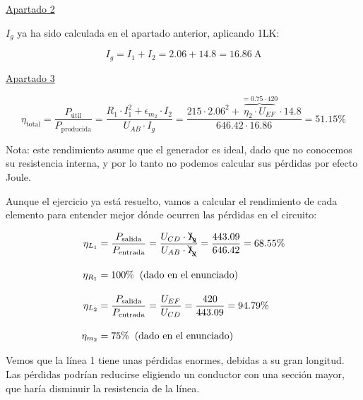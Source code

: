 \documentclass[10pt]{article}
\begin{document}
\vspace{4mm}

\underline{Apartado 2}

\vspace{4mm}

$I_g$ ya ha sido calculada en el apartado anterior, aplicando 1LK:

\[
    I_g = I_1 + I_2 = 2.06 + 14.8 = \boxed{ \qty{16.86}{\ampere} }
\]

\vspace{4mm}

\underline{Apartado 3}

\vspace{-1mm}

\[
    \eta_{\textrm{total}} = \frac{P_{\textrm{útil}}}{P_{\textrm{producida}}} = \frac{R_1\cdot I_1^2 + \epsilon_{m_2} \cdot I_2}{U_{AB} \cdot I_g} = \frac{215 \cdot 2.06^2 + \overbrace{\eta_2 \cdot U_{EF}}^{=0.75\cdot 420} \cdot 14.8}{646.42 \cdot 16.86} = \boxed{51.15\%}
\]

Nota: este rendimiento asume que el generador es ideal, dado que no conocemos su resistencia interna, y por lo tanto no podemos calcular sus pérdidas por efecto Joule.

Aunque el ejercicio ya está resuelto, vamos a calcular el rendimiento de cada elemento para entender mejor dónde ocurren las pérdidas en el circuito:

\begin{align*}
    \eta_{L_1} &= \frac{P_{\textrm{salida}}}{P_{\textrm{entrada}}} = \frac{U_{CD}\cdot \bcancel{I_g}}{U_{AB} \cdot \bcancel{I_g}} = \frac{443.09}{646.42} = 68.55\%\\[10pt]
    \eta_{R_1} &= 100\% \;\; \text{(dado en el enunciado)}\\[10pt]
    \eta_{L_2} &= \frac{P_{\textrm{salida}}}{P_{\textrm{entrada}}} = \frac{U_{EF}}{U_{CD}} = \frac{420}{443.09} = 94.79\%\\[10pt]
    \eta_{m_2} &= 75\% \;\; \text{(dado en el enunciado)}  
\end{align*}

Vemos que la línea 1 tiene unas pérdidas enormes, debidas a su gran longitud. Las pérdidas podrían reducirse eligiendo un conductor con una sección mayor, que haría disminuir la resistencia de la línea.
\end{document}
